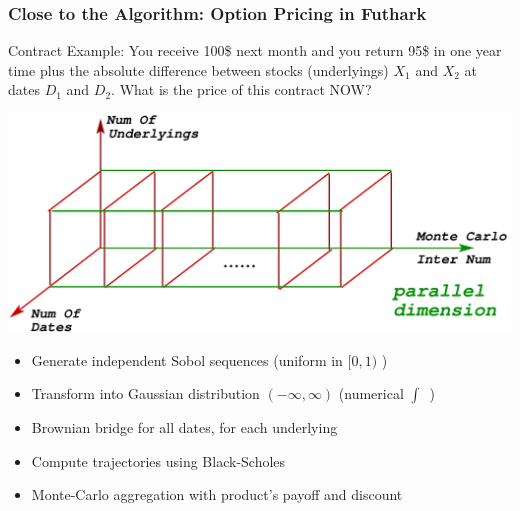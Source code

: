 \documentclass{beamer}
\newcommand{\emp}[1]{\textcolor{DikuRed}{ #1}}
\begin{document}
\begin{frame}[fragile]
	\tableofcontents[currentsubsection]
\end{frame}

\begin{frame}[fragile,t]
\frametitle{Close to the Algorithm: Option Pricing in Futhark}

\emp{Contract Example}: You receive 100\$ next month and you return 95\$ in one 
year time plus the absolute difference between stocks (underlyings) $X_1$ and $X_2$ at 
dates $D_1$ and $D_2$.  \emp{What is the price of this contract NOW?} 


\begin{center}
\includegraphics[height=18ex]{Figures/PricingMemSpace}
\end{center}

\begin {itemize}
    \item Generate independent Sobol sequences (uniform in $[0,1)$ ) %
    \item Transform into Gaussian distribution $ ( -\infty , \infty )$ (numerical $\int$~)
    \item Brownian bridge for all dates, for each underlying
    \item Compute trajectories using Black-Scholes
    \item Monte-Carlo aggregation with product's payoff and discount
\end{itemize}
\end{frame}
\end{document}

